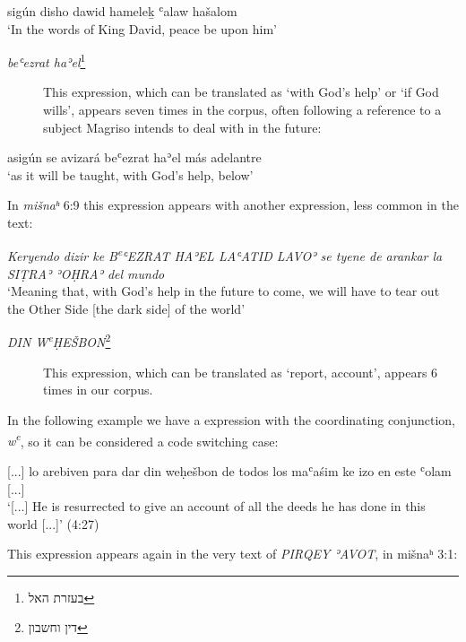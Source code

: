 \documentclass[output=paper,colorlinks,citecolor=brown,babel,arabicfont]{langscibook}
\begin{document}
\ea\label{ch3.7.ex.n2}
sigún disho dawid hamele\b{k} {ʿalaw hašalom} \\
`In the words of King David, peace be upon him'
\z

\begin{description}
 \item[\textit{beʿezrat haʾel}\footnote{\texthebrew{בעזרת האל}}]

This expression, which can be translated as `with God's help' or `if God wills', appears seven times in the corpus, often following a reference to a subject Magriso intends to deal with in the future:
\end{description}

\ea\label{ch3.7.ex.n3}
asigún {se avizará} {beʿezrat haʾel} {más adelantre} \\
`as it will be taught, with God's help, below'
\z

In \textit{mišnaʰ} 6:9 this expression appears with another expression, less common in the text:

\ea\label{ch3.7.ex.n4}
\textit{Keryendo dizir ke B\textsuperscript{e}ʿEZRAT HAʾEL LAʿATID LAVOʾ se tyene de arankar la SIṬRAʾ ʾOḤRAʾ del mundo} \\
`Meaning that, with God's help in the future to come, we will have to tear out the Other Side [the dark side] of the world'
\z

\begin{description}
\item[\textit{DIN W\textsuperscript{e}ḤEŠBON}\footnote{\texthebrew{דין וחשבון}}]

This expression, which can be translated as `report, account', appears 6 times in our corpus.
\end{description}

In the following example we have a  expression with the  coordinating conjunction, \textit{w\textsuperscript{e}}, so it can be considered a code switching case:

\ea\label{ch3.7.ex.n5}
{[...]} lo arebiven para dar din weḥešbon de todos los maʿaśim ke izo en este ʿolam {[...]} \\
`{[...]} He is resurrected to give an account of all the deeds he has done in this world {[...]}' (4:27)
\z

This expression appears again in the very text of \textit{PIRQEY ʾAVOT}, in mišnaʰ 3:1: 
\end{document}
